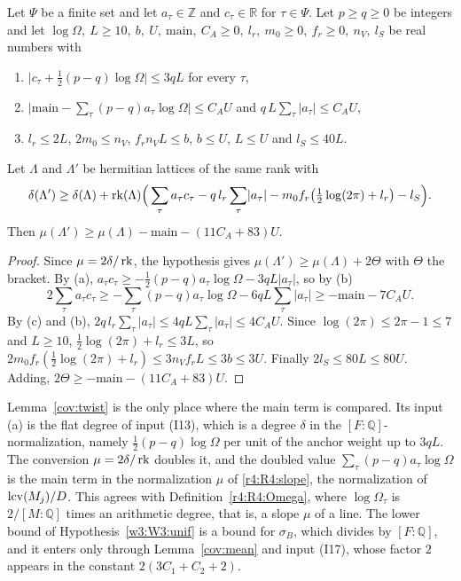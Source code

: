 \begin{lemma}\label{cov:twist}
Let $\Psi$ be a finite set and let $a_\tau\in\mathbb Z$ and $c_\tau\in\mathbb R$ for $\tau\in\Psi$. Let $p\ge q\ge0$ be integers and let $\log\Omega,\ L\ge10,\ b,\ U,\ \mathrm{main},\ C_A\ge0,\ l_r,\ m_0\ge0,\ f_r\ge0,\ n_V,\ l_S$ be real numbers with
\begin{enumerate}
\item[(a)] $\lvert c_\tau+\frac12(p-q)\log\Omega\rvert\le3qL$ for every $\tau$,
\item[(b)] $\big\lvert\mathrm{main}-\sum_\tau(p-q)a_\tau\log\Omega\big\rvert\le C_AU$ and $q\,L\sum_\tau\lvert a_\tau\rvert\le C_AU$,
\item[(c)] $l_r\le2L$, $2m_0\le n_V$, $f_rn_VL\le b$, $b\le U$, $L\le U$ and $l_S\le40L$.
\end{enumerate}
Let $\Lambda$ and $\Lambda'$ be hermitian lattices of the same rank with
\[
\delta(\Lambda')\ge\delta(\Lambda)+\operatorname{rk}(\Lambda)\Big(\sum_\tau a_\tau c_\tau-q\,l_r\sum_\tau\lvert a_\tau\rvert-m_0f_r\big(\tfrac12\log(2\pi)+l_r\big)-l_S\Big).
\]
Then $\mu(\Lambda')\ge\mu(\Lambda)-\mathrm{main}-(11C_A+83)U$.
\end{lemma}

\begin{proof}
Since $\mu=2\delta/\operatorname{rk}$, the hypothesis gives $\mu(\Lambda')\ge\mu(\Lambda)+2\Theta$ with $\Theta$ the bracket. By (a), $a_\tau c_\tau\ge-\frac12(p-q)a_\tau\log\Omega-3qL\lvert a_\tau\rvert$, so by (b)
\[
2\sum_\tau a_\tau c_\tau\ge-\sum_\tau(p-q)a_\tau\log\Omega-6qL\sum_\tau\lvert a_\tau\rvert\ge-\mathrm{main}-7C_AU .
\]
By (c) and (b), $2q\,l_r\sum_\tau\lvert a_\tau\rvert\le4qL\sum_\tau\lvert a_\tau\rvert\le4C_AU$. Since $\log(2\pi)\le2\pi-1\le7$ and $L\ge10$, $\frac12\log(2\pi)+l_r\le3L$, so $2m_0f_r(\frac12\log(2\pi)+l_r)\le3n_Vf_rL\le3b\le3U$. Finally $2l_S\le80L\le80U$. Adding, $2\Theta\ge-\mathrm{main}-(11C_A+83)U$.
\end{proof}

\begin{remark}\label{cov:factor2}
Lemma~\ref{cov:twist} is the only place where the main term is compared. Its input (a) is the flat degree of input (I13), which is a degree $\delta$ in the $[F:\mathbb Q]$-normalization, namely $\frac12(p-q)\log\Omega$ per unit of the anchor weight up to $3qL$. The conversion $\mu=2\delta/\operatorname{rk}$ doubles it, and the doubled value $\sum_\tau(p-q)a_\tau\log\Omega$ is the main term in the normalization $\mu$ of \eqref{r4:R4:slope}, the normalization of $\operatorname{lcv}(M_j)/D$. This agrees with Definition~\ref{r4:R4:Omega}, where $\log\Omega_\tau$ is $2/[M:\mathbb Q]$ times an arithmetic degree, that is, a slope $\mu$ of a line. The lower bound of Hypothesis~\ref{w3:W3:unif} is a bound for $\sigma_B$, which divides by $[F:\mathbb Q]$, and it enters only through Lemma~\ref{cov:mean} and input (I17), whose factor $2$ appears in the constant $2(3C_1+C_2+2)$.
\end{remark}

